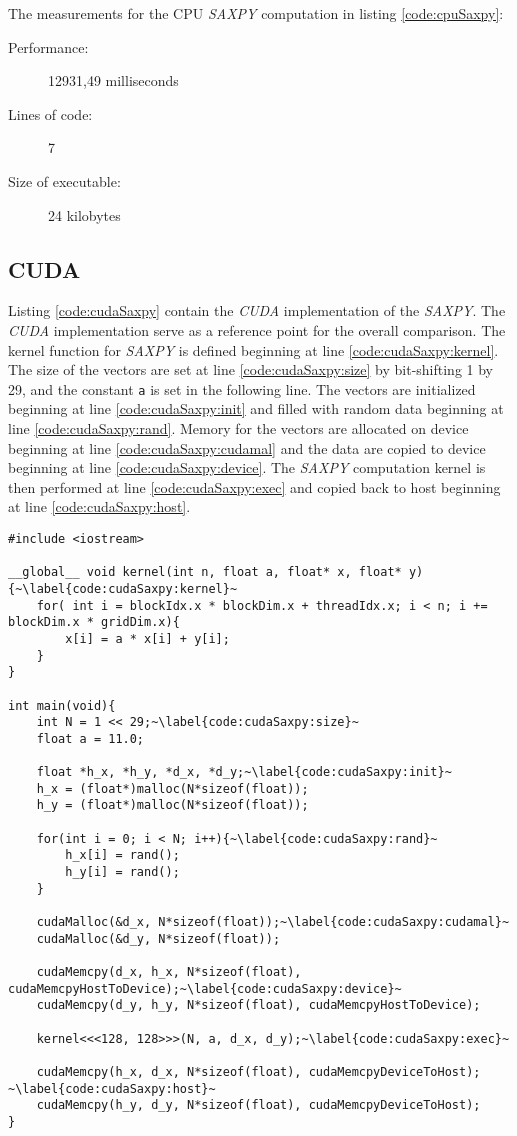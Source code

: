 The measurements for the CPU \textit{SAXPY} computation in listing \ref{code:cpuSaxpy}:
\begin{description}
    \item[Performance:] 12931,49 milliseconds
    \item[Lines of code:] 7 
    \item[Size of executable:] 24 kilobytes
\end{description}

\subsection{CUDA}
Listing \ref{code:cudaSaxpy} contain the \textit{CUDA} implementation of the \textit{SAXPY}. The \textit{CUDA} implementation serve as a reference point for the overall comparison. The kernel function for \textit{SAXPY} is defined beginning at line \ref{code:cudaSaxpy:kernel}. The size of the vectors are set at line \ref{code:cudaSaxpy:size} by bit-shifting 1 by 29, and the constant \texttt{a} is set in the following line. The vectors are initialized beginning at line \ref{code:cudaSaxpy:init} and filled with random data beginning at line \ref{code:cudaSaxpy:rand}. Memory for the vectors are allocated on device beginning at line \ref{code:cudaSaxpy:cudamal} and the data are copied to device beginning at line \ref{code:cudaSaxpy:device}. The \textit{SAXPY} computation kernel is then performed at line \ref{code:cudaSaxpy:exec} and copied back to host beginning at line \ref{code:cudaSaxpy:host}.

\begin{lstlisting}[caption={\textit{CUDA} \textit{SAXPY} Implementation.}, label={code:cudaSaxpy}]
#include <iostream>

__global__ void kernel(int n, float a, float* x, float* y){~\label{code:cudaSaxpy:kernel}~
    for( int i = blockIdx.x * blockDim.x + threadIdx.x; i < n; i += blockDim.x * gridDim.x){
        x[i] = a * x[i] + y[i];
    }
}

int main(void){
    int N = 1 << 29;~\label{code:cudaSaxpy:size}~
    float a = 11.0;

    float *h_x, *h_y, *d_x, *d_y;~\label{code:cudaSaxpy:init}~
    h_x = (float*)malloc(N*sizeof(float));
    h_y = (float*)malloc(N*sizeof(float));

    for(int i = 0; i < N; i++){~\label{code:cudaSaxpy:rand}~
        h_x[i] = rand();
        h_y[i] = rand();
    }

    cudaMalloc(&d_x, N*sizeof(float));~\label{code:cudaSaxpy:cudamal}~
    cudaMalloc(&d_y, N*sizeof(float));

    cudaMemcpy(d_x, h_x, N*sizeof(float), cudaMemcpyHostToDevice);~\label{code:cudaSaxpy:device}~
    cudaMemcpy(d_y, h_y, N*sizeof(float), cudaMemcpyHostToDevice);

    kernel<<<128, 128>>>(N, a, d_x, d_y);~\label{code:cudaSaxpy:exec}~

    cudaMemcpy(h_x, d_x, N*sizeof(float), cudaMemcpyDeviceToHost); ~\label{code:cudaSaxpy:host}~
    cudaMemcpy(h_y, d_y, N*sizeof(float), cudaMemcpyDeviceToHost);
}
\end{lstlisting}

